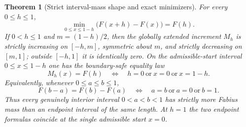 \documentclass[11pt,oneside]{article}
\newtheorem{theorem}{Theorem}[section]
\theoremstyle{definition}
\theoremstyle{remark}
\numberwithin{equation}{section}
\begin{document}
\begin{theorem}[Strict interval-mass shape and exact minimizers]
\label{thm:least-mass}
For every $0\le h\le1$,
\begin{equation}\label{eq:least-mass}
 \min_{0\le x\le1-h}\bigl(F(x+h)-F(x)\bigr)=F(h).
\end{equation}
If $0<h\le1$ and $m=(1-h)/2$, then the globally extended increment $M_h$ is
strictly increasing on $[-h,m]$, symmetric about $m$, and strictly decreasing
on $[m,1]$; outside $[-h,1]$ it is identically zero.  On the admissible-start
interval $0\le x\le1-h$ one has the boundary-safe equality law
\begin{equation}\label{eq:least-mass-equality}
 M_h(x)=F(h)
 \quad\Longleftrightarrow\quad
 h=0\ \text{or}\ x=0\ \text{or}\ x=1-h.
\end{equation}
Equivalently, whenever $0\le a\le b\le1$,
\begin{equation}\label{eq:least-mass-equality-ab}
 F(b-a)=F(b)-F(a)
 \quad\Longleftrightarrow\quad
 a=b\ \text{or}\ a=0\ \text{or}\ b=1.
\end{equation}
Thus every genuinely interior interval $0<a<b<1$ has strictly more Fabius
mass than an endpoint interval of the same length.  At $h=1$ the two endpoint
formulas coincide at the single admissible start $x=0$.
\end{theorem}
\end{document}
